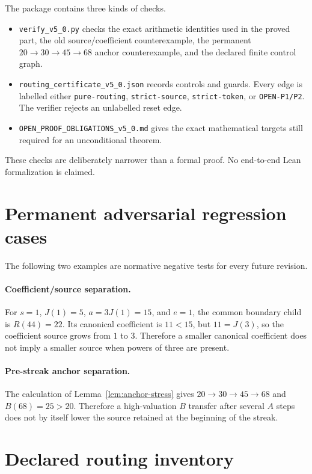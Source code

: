 \documentclass[11pt]{article}
\begin{document}
The package contains three kinds of checks.
\begin{itemize}[leftmargin=*]
\item \texttt{verify\_v5\_0.py} checks the exact arithmetic identities used in
the proved part, the old source/coefficient counterexample, the permanent
$20\to30\to45\to68$ anchor counterexample, and the declared finite control
graph.
\item \texttt{routing\_certificate\_v5\_0.json} records controls and guards.
Every edge is labelled either \texttt{pure-routing}, \texttt{strict-source},
\texttt{strict-token}, or \texttt{OPEN-P1/P2}.  The verifier rejects an
unlabelled reset edge.
\item \texttt{OPEN\_PROOF\_OBLIGATIONS\_v5\_0.md} gives the exact mathematical
targets still required for an unconditional theorem.
\end{itemize}

These checks are deliberately narrower than a formal proof.  No end-to-end
Lean formalization is claimed.

\appendix
\section{Permanent adversarial regression cases}\label{app:regressions}

The following two examples are normative negative tests for every future
revision.

\paragraph{Coefficient/source separation.}
For $s=1$, $J(1)=5$, $a=3J(1)=15$, and $e=1$, the common boundary child is
$R(44)=22$.  Its canonical coefficient is $11<15$, but $11=J(3)$, so the
coefficient source grows from $1$ to $3$.  Therefore a smaller canonical
coefficient does not imply a smaller source when powers of three are present.

\paragraph{Pre-streak anchor separation.}
The calculation of Lemma~\ref{lem:anchor-stress} gives
$20\to30\to45\to68$ and $B(68)=25>20$.  Therefore a high-valuation $B$
transfer after several $A$ steps does not by itself lower the source retained
at the beginning of the streak.

\section{Declared routing inventory}\label{app:routing}
\end{document}
